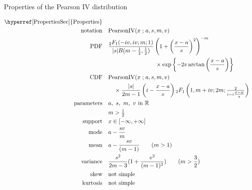 

\begin{table*}[t!]
 \caption[Pearson  IV distribution -- Properties]{Properties of the Pearson  IV distribution}

\begin{align*}
\text{\hyperref[PropertiesSec]{Properties}}  \quad& \\
\text{notation} \quad & \text{PearsonIV}(x \given a,s, m,v)  
\\
\text{PDF}\quad &    \frac{{}_{2}F_1(-i v, i v ; m;1)  }{|s| B(m-\frac{1}{2}, \frac{1}{2} )} \left( 1 +\left( \frac{x-a}{s}\right)^2 \right)^{-m}
\\ \notag & \qquad \qquad \qquad \qquad \times \exp \left\{ - 2 v \arctan \left( \frac{x-a}{s}\right) \right\}
\checked
\\
\text{CDF} \quad  &    \text{PearsonIV}(x\given a,s, m,v)  \\ & \quad  \times \frac{|s|}{2m-1}\left( i - \frac{x-a}{s}\right) {}_2F_1\left(1,m+iv; 2m; \tfrac{2}{i-i\tfrac{x-a}{s}} \right) \checked
\\
\text{parameters}\quad &   a,\  s,\  m,\ v \text{ in } \Real
\\ & m>\tfrac{1}{2}
\\
\text{support} \quad &   x \in [-\infty, + \infty]
\\
\text{mode} \quad  & a - \frac{sv}{m}  \checked
\\
\text{mean} \quad  &  a - \frac{sv}{(m-1)} \qquad (m>1) \checked
\\
\text{variance} \quad  & \frac{s^2}{2m-3} (1 + \frac{v^2}{(m-1)^2})  \qquad (m>\frac{3}{2}) \checked
\\
\text{skew} \quad  &  \text{not simple}
\\
\text{kurtosis} \quad  &  \text{not simple}
\end{align*}
\end{table*}






